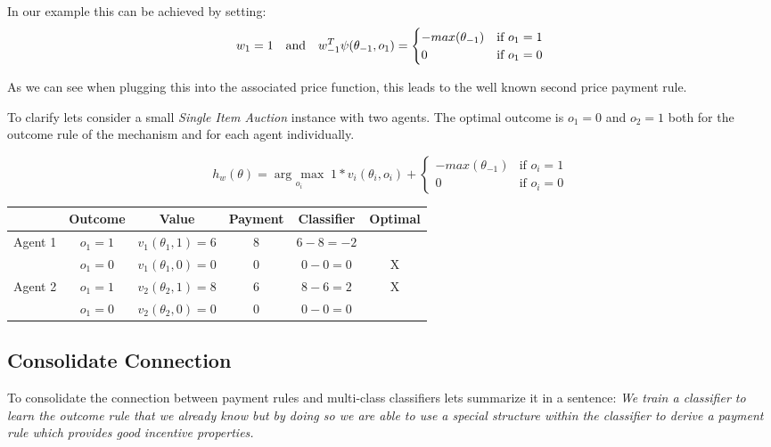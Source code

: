 \documentclass[]{article}
\newcommand{\argmax}[1]{\underset{#1}{\operatorname{arg}\,\operatorname{max}}\;}
\newcommand\Tstrut{\rule{0pt}{2.6ex}}         %
\begin{document}
\noindent In our example this can be achieved by setting: 
\begin{equation*}
	w_{1} = 1 \text{\quad and\quad} w_{-1}^T \psi(\theta_{-1},o_{1})= 
	\begin{cases}
	- max(\theta_{-1})& \text{if } o_{1} = 1\\
	0              & \text{if } o_{1} = 0
	\end{cases}
\end{equation*}

\noindent As we can see when plugging this into the associated price function, this leads to the well known second price payment rule.

\noindent To clarify lets consider a small \emph{Single Item Auction} instance with two agents. The optimal outcome is $o_{1}=0$ and $o_{2}=1$ both for the  outcome rule of the mechanism and for each agent individually.

\begin{equation*}
h_{w}(\theta) = \argmax{o_{i}} 1 * v_{i}(\theta_{i},o_{i}) +
\begin{cases}
- max(\theta_{-1})& \text{if } o_{i} = 1\\
0              & \text{if } o_{i} = 0
\end{cases}
\end{equation*}

\noindent
\begin{tabular}{|c|c|c|c|c|c|}
	\hline 
	 & \textbf{Outcome} & \textbf{Value} & \textbf{Payment} & \textbf{Classifier} & \textbf{Optimal} \Tstrut \\ 
	\hline 
	 \multirow{2}{*}{Agent 1} 	&$o_{1}=1$		& 	$v_{1}(\theta_{1},1) = 6$ 	& 8	&$6 - 8 = -2$ &	\Tstrut \\\cline{2-6}
								&$o_{1}=0$	&	$v_{1}(\theta_{1},0) = 0$	& 0	&$0 - 0 = 0$ &X	\Tstrut\\ 
	\hline 
	\multirow{2}{*}{Agent 2}  	&$o_{1}=1$	&	$v_{2}(\theta_{2},1) = 8$	& 6	&$8-6 = 2$	&X	\Tstrut \\	\cline{2-6}
								&$o_{1}=0$		&	$v_{2}(\theta_{2},0) = 0$	& 0	&$0 - 0 = 0$ & \Tstrut\\ 
	\hline 
\end{tabular} 


\subsection{Consolidate Connection}
To consolidate the connection between payment rules and multi-class classifiers lets summarize it in a sentence:
\emph{We train a classifier to learn the outcome rule that we already know but by doing so we are able to use a special structure within the classifier to derive a payment rule which provides good incentive properties.}
\end{document}
